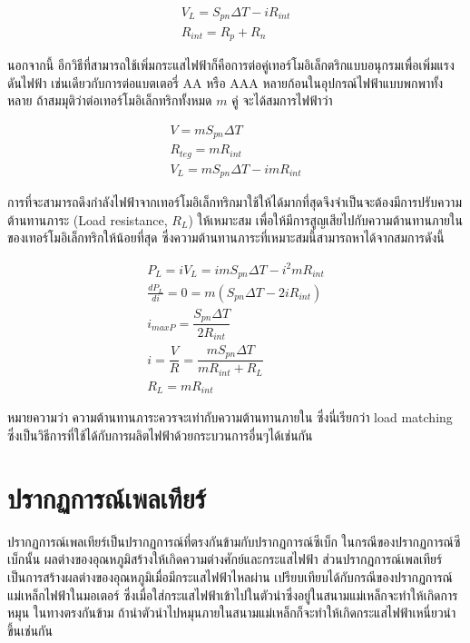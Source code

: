 \documentclass[a4paper,nobib,openany,10pt]{tufte-book}
\begin{document}
\[\begin{gathered}
  V_L = S_{pn}\Delta T - iR_{int} \\
  R_{int} = R_p + R_n\end{gathered}\]

นอกจากนี้ อีกวิธีที่สามารถใช้เพิ่มกระแสไฟฟ้าก็คือการต่อคู่เทอร์โมอิเล็กตริกแบบอนุกรมเพื่อเพิ่มแรงดันไฟฟ้า เช่นเดียวกับการต่อแบตเตอรี่ AA หรือ AAA หลายก้อนในอุปกรณ์ไฟฟ้าแบบพกพาทั้งหลาย ถ้าสมมุติว่าต่อเทอร์โมอิเล็กทริกทั้งหมด \(m\) คู่ จะได้สมการไฟฟ้าว่า

\[\begin{gathered}
  V = m S_{pn} \Delta T \\
  R_{teg} = m R_{int} \\
  V_L = m S_{pn} \Delta T - i mR_{int}\end{gathered}\]

การที่จะสามารถดึงกำลังไฟฟ้าจากเทอร์โมอิเล็กทริกมาใช้ให้ได้มากที่สุดจึงจำเป็นจะต้องมีการปรับความต้านทานภาระ (Load resistance, \(R_L\)) ให้เหมาะสม เพื่อให้มีการสูญเสียไปกับความต้านทานภายในของเทอร์โมอิเล็กทริกให้น้อยที่สุด ซึ่งความต้านทานภาระที่เหมาะสมนี้สามารถหาได้จากสมการดังนี้

\[\begin{gathered}
  P_L = iV_L = i m S_{pn} \Delta T - i^2 m R_{int} \\
  \frac{d P_L}{d i } = 0 = m(S_{pn} \Delta T - 2 i R_{int}) \\
  i_{max P} = \dfrac{S_{pn} \Delta T}{2 R_{int}} \\
  i = \dfrac{V}{R} = \dfrac{ m S_{pn} \Delta T }{ m R_{int} + R_L } \\
  R_L = m R_{int}\end{gathered}\]

หมายความว่า ความต้านทานภาระควรจะเท่ากับความต้านทานภายใน ซึ่งนี่เรียกว่า
load matching
ซึ่งเป็นวิธีการที่ใช้ได้กับการผลิตไฟฟ้าด้วยกระบวนการอื่นๆได้เช่นกัน

\section{ปรากฏการณ์เพลเทียร์}
\label{sec:org3055419}
ปรากฏการณ์เพลเทียร์เป็นปรากฏการณ์ที่ตรงกันข้ามกับปรากฏการณ์ซีเบ็ก  ในกรณีของปรากฏการณ์ซีเบ็กนั้น ผลต่างของอุณหภูมิสร้างให้เกิดความต่างศักย์และกระแสไฟฟ้า ส่วนปรากฏการณ์เพลเทียร์เป็นการสร้างผลต่างของอุณหภูมิเมื่อมีกระแสไฟฟ้าไหลผ่าน เปรียบเทียบได้กับกรณีของปรากฏการณ์แม่เหล็กไฟฟ้าในมอเตอร์ ซึ่งเมื่อใส่กระแสไฟฟ้าเข้าไปในตัวนำซึ่งอยู่ในสนามแม่เหล็กจะทำให้เกิดการหมุน ในทางตรงกันข้าม ถ้านำตัวนำไปหมุนภายในสนามแม่เหล็กก็จะทำให้เกิดกระแสไฟฟ้าเหนี่ยวนำขึ้นเช่นกัน
\end{document}
